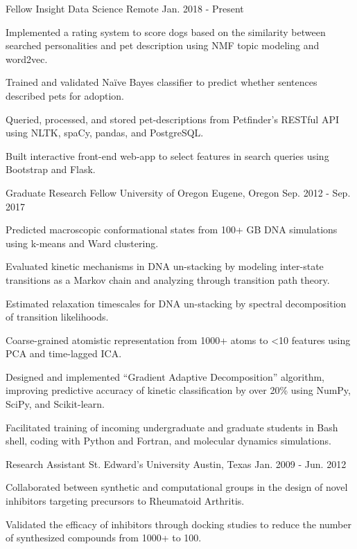 \begin{cventries}
    \cventry
		{Fellow}
		{Insight Data Science}
		{Remote}
		{Jan. 2018 - Present}
		{
			\begin{cvitems}
				\item{Implemented a rating system to score dogs based on the similarity between searched personalities and pet description using NMF topic modeling and word2vec.}
				\item{Trained and validated Na\"{i}ve Bayes classifier to predict whether sentences described pets for adoption.}
				\item{Queried, processed, and stored pet-descriptions from Petfinder's RESTful API using NLTK, spaCy, pandas, and PostgreSQL.}
			    \item{Built interactive front-end web-app to select features in search queries using Bootstrap and Flask.}
			\end{cvitems}
		}

	\cventry
		{Graduate Research Fellow}
		{University of Oregon}
		{Eugene, Oregon}
		{Sep. 2012 - Sep. 2017}
		{
			\begin{cvitems}
				\item{Predicted macroscopic conformational states from 100+ GB DNA simulations using k-means and Ward clustering.}
				\item{Evaluated kinetic mechanisms in DNA un-stacking by modeling inter-state transitions as a Markov chain and analyzing through transition path theory.}
				\item{Estimated relaxation timescales for DNA un-stacking by spectral decomposition of transition likelihoods.}
				\item{Coarse-grained atomistic representation from 1000+ atoms to <10 features using PCA and time-lagged ICA.}
				\item{Designed and implemented ``Gradient Adaptive Decomposition'' algorithm, improving predictive accuracy of kinetic classification by over 20\% using NumPy, SciPy, and Scikit-learn.}
				\item{Facilitated training of incoming undergraduate and graduate students in Bash shell, coding with Python and Fortran, and molecular dynamics simulations.}
			\end{cvitems}
		}

	\cventry
		{Research Assistant}
		{St. Edward's University}
		{Austin, Texas}
		{Jan. 2009 - Jun. 2012}
		{
			\begin{cvitems}
			    \item{Collaborated between synthetic and computational groups in the design of novel inhibitors targeting precursors to Rheumatoid Arthritis.}
			    \item{Validated the efficacy of inhibitors through docking studies to reduce the number of synthesized compounds from 1000+ to 100.}
			\end{cvitems}
		}
\end{cventries}
